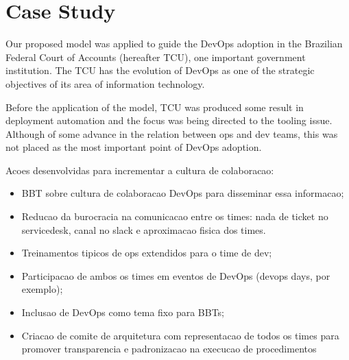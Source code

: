 \section{Case Study} \label{sec:case_study}

Our proposed model was applied to guide the DevOps adoption in the Brazilian Federal Court of Accounts (hereafter TCU), one important government institution. The TCU has the evolution of DevOps as one of the strategic objectives of its area of information technology.

Before the application of the model, TCU was produced some result in deployment automation and the focus was being directed to the tooling issue. Although of some advance in the relation between ops and dev teams, this was not placed as the most important point of DevOps adoption.

Acoes desenvolvidas para incrementar a cultura de colaboracao:
\begin{itemize}
\item BBT sobre cultura de colaboracao DevOps para disseminar essa informacao;
\item Reducao da burocracia na comunicacao entre os times: nada de ticket no servicedesk, canal no slack e aproximacao fisica dos times.
\item Treinamentos tipicos de ops extendidos para o time de dev;
\item Participacao de ambos os times em eventos de DevOps (devops days, por exemplo);
\item Inclusao de DevOps como tema fixo para BBTs;
\item Criacao de comite de arquitetura com representacao de todos os times para promover transparencia e padronizacao na execucao de procedimentos
\end{itemize}
